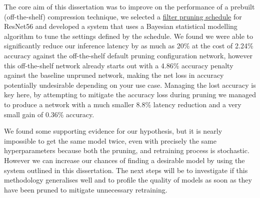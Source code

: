 \documentclass[../Dissertation.tex]{subfiles}
\begin{document}
The core aim of this dissertation was to improve on the performance of a prebuilt (off-the-shelf) compression technique, we selected a \href{https://github.com/friedforfun/distiller/blob/master/examples/pruning_filters_for_efficient_convnets/resnet56_cifar_filter_rank_v2.yaml}{filter pruning schedule} for ResNet56 and developed a system that uses a Bayesian statistical modelling algorithm to tune the settings defined by the schedule.
We found we were able to significantly reduce our inference latency by as much as 20\% at the cost of 2.24\% accuracy against the off-the-shelf default pruning configuration network, however this off-the-shelf network already starts out with a 4.86\% accuracy penalty against the baseline unpruned network, making the net loss in accuracy potentially undesirable depending on your use case.
Managing the lost accuracy is key here, by attempting to mitigate the accuracy loss during pruning we managed to produce a network with a much smaller 8.8\% latency reduction and a very small gain of 0.36\% accuracy.

We found some supporting evidence for our hypothesis, but it is nearly impossible to get the same model twice, even with precisely the same hyperparameters because both the pruning, and retraining process is stochastic. 
However we can increase our chances of finding a desirable model by using the system outlined in this dissertation.
The next steps will be to investigate if this methodology generalises well and to profile the quality of models as soon as they have been pruned to mitigate unnecessary retraining.
\end{document}
